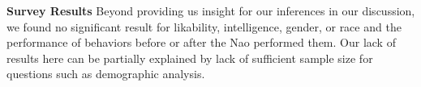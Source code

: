\documentclass{acm_proc_article-sp}
\begin{document}



\textbf{Survey Results} Beyond providing us insight for our inferences in our discussion, we found no significant result for likability, intelligence, gender, or race and the performance of behaviors before or after the Nao performed them. Our lack of results here can be partially explained by lack of sufficient sample size for questions such as demographic analysis.
\end{document}
